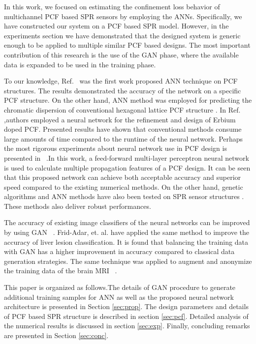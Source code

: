 \documentclass[journal]{IEEEtran}
\begin{document}
In this work, we focused on estimating the confinement loss behavior of multichannel PCF based SPR sensors by employing the ANNs. Specifically, we have constructed our system on a PCF based SPR model. However, in the experiments section we have demonstrated that the designed system is generic enough to be applied to multiple similar PCF based designs. The most important contribution of this research is the use of the GAN phase, where the available data is expanded to be used in the training phase.

To our knowledge, Ref.~\cite{hameed2008accurate} was the first work proposed ANN technique on PCF structures. The results demonstrated the accuracy of the network on a specific PCF structure. On the other hand, ANN method was employed for predicting the chromatic dispersion of conventional hexagonal lattice PCF structure \cite{rodriguez2010efficient}. In Ref. \cite{mescia2011refinement},authors employed a neural network for the refinement and design of Erbium doped PCF. Presented results have shown that conventional methods consume large amounts of time compared to the runtime of the neural network. Perhaps the most rigorous experiments about neural network use in PCF design is presented in  \cite{paper0}.In this work, a feed-forward multi-layer perceptron neural network is used to calculate multiple propagation features of a PCF design. It can be seen that this proposed network can achieve both acceptable accuracy and superior speed compared to the existing numerical methods. On the other hand, genetic algorithms and ANN methods have also been tested on SPR sensor structures \cite{fu2018optimization,mcatee2019artificial}. These methods also deliver robust performances.

The accuracy of existing image classifiers of the neural networks can be improved by using GAN  \cite{perez2017effectiveness}. Frid-Adar, et. al. \cite{frid2018synthetic} have applied the same method to improve the accuracy of liver lesion classification. It is found that balancing the training data with GAN has a higher improvement in accuracy compared to classical data generation strategies. The same technique was applied to augment and anonymize the training data of the brain MRI  \cite{shin2018medical}.


This paper is organized as follows.The details of GAN procedure to generate additional training samples for ANN as well as the proposed neural network architecture is presented in Section \ref{sec:prop}. The design parameters and details of PCF based SPR structure is described in section \ref{sec:pcf}. Detailed analysis of the numerical results is discussed in section \ref{sec:exp}. Finally, concluding remarks are presented in Section \ref{sec:conc}.
\end{document}
